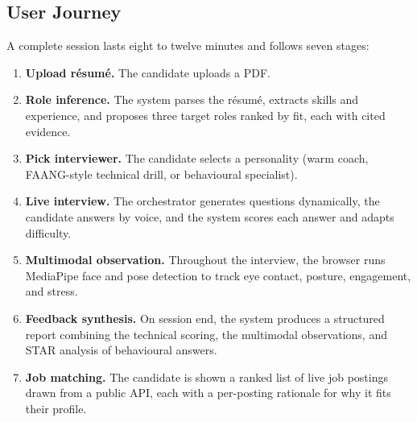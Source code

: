 \documentclass[11pt,a4paper]{article}
\begin{document}
\subsection{User Journey}

A complete session lasts eight to twelve minutes and follows seven stages:

\begin{enumerate}
  \item \textbf{Upload résumé.} The candidate uploads a PDF.
  \item \textbf{Role inference.} The system parses the résumé, extracts
        skills and experience, and proposes three target roles ranked by
        fit, each with cited evidence.
  \item \textbf{Pick interviewer.} The candidate selects a personality
        (warm coach, FAANG-style technical drill, or behavioural specialist).
  \item \textbf{Live interview.} The orchestrator generates questions
        dynamically, the candidate answers by voice, and the system scores
        each answer and adapts difficulty.
  \item \textbf{Multimodal observation.} Throughout the interview, the
        browser runs MediaPipe face and pose detection to track eye contact,
        posture, engagement, and stress.
  \item \textbf{Feedback synthesis.} On session end, the system produces a
        structured report combining the technical scoring, the multimodal
        observations, and STAR analysis of behavioural answers.
  \item \textbf{Job matching.} The candidate is shown a ranked list of live
        job postings drawn from a public API, each with a per-posting
        rationale for why it fits their profile.
\end{enumerate}

\vspace{4pt}
\end{document}
